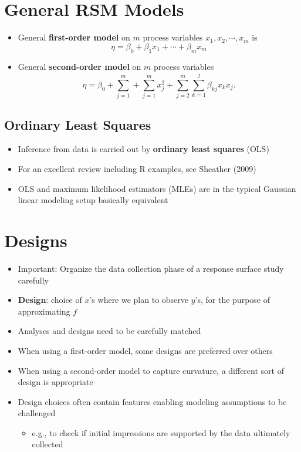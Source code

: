 \documentclass[
  letterpaper,
  DIV=11,
  numbers=noendperiod]{scrreprt}
\providecommand{\tightlist}{%
  \setlength{\itemsep}{0pt}\setlength{\parskip}{0pt}}\usepackage{longtable,booktabs,array}
\begin{document}
\hypertarget{general-rsm-models}{%
\section{General RSM Models}\label{general-rsm-models}}

\begin{itemize}
\tightlist
\item
  General \textbf{first-order model} on \(m\) process variables
  \(x_1, x_2, \cdots, x_m\) is
  \[\eta = \beta_0 + \beta_1x_1 + \cdots + \beta_m x_m\]
\item
  General \textbf{second-order model} on \(m\) process variables \[
  \eta= \beta_0 + \sum_{j=1}^m + \sum_{j=1}^m x_j^2 + \sum_{j=2}^m \sum_{k=1}^j \beta_{kj}x_k x_j.
  \]
\end{itemize}

\hypertarget{ordinary-least-squares}{%
\subsection{Ordinary Least Squares}\label{ordinary-least-squares}}

\begin{itemize}
\tightlist
\item
  Inference from data is carried out by \textbf{ordinary least squares}
  (OLS)
\item
  For an excellent review including R examples, see Sheather (2009)
\item
  OLS and maximum likelihood estimators (MLEs) are in the typical
  Gaussian linear modeling setup basically equivalent
\end{itemize}

\hypertarget{designs}{%
\section{Designs}\label{designs}}

\begin{itemize}
\tightlist
\item
  Important: Organize the data collection phase of a response surface
  study carefully
\item
  \textbf{Design}: choice of \(x\)'s where we plan to observe \(y\)'s,
  for the purpose of approximating \(f\)
\item
  Analyses and designs need to be carefully matched
\item
  When using a first-order model, some designs are preferred over others
\item
  When using a second-order model to capture curvature, a different sort
  of design is appropriate
\item
  Design choices often contain features enabling modeling assumptions to
  be challenged

  \begin{itemize}
  \tightlist
  \item
    e.g., to check if initial impressions are supported by the data
    ultimately collected
  \end{itemize}
\end{itemize}
\end{document}
